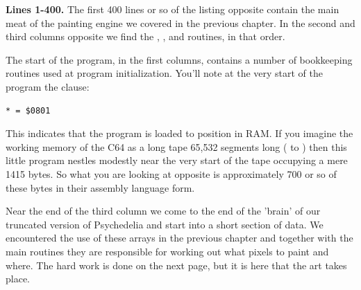 \clearpage
\textbf{Lines 1-400. } The first 400 lines or so of the listing opposite
contain the main meat of the painting engine we covered in the previous chapter. In the second
and third columns opposite we find the , ,
and  routines, in that order.

The start of the program, in the first columns, contains a number of bookkeeping routines used
at program initialization. You'll note at the very start of the program the clause:
\begin{lstlisting}
* = $0801
\end{lstlisting}
This indicates that the program is loaded to position  in RAM. If you imagine the
working memory of the C64 as a long tape 65,532 segments long ( to ) then
this little program nestles modestly near the very start of the tape occupying a mere 1415 bytes. So
what you are looking at opposite is approximately 700 or so of these bytes in their assembly language
form.

Near the end of the third column we come to the end of the 'brain' of our truncated version of 
Psychedelia and start into a short section of data. We encountered the use of these arrays in the 
previous chapter and together with the main routines they are responsible for working out what pixels
to paint and where. The hard work is done on the next page, but it is here that the art takes place.

